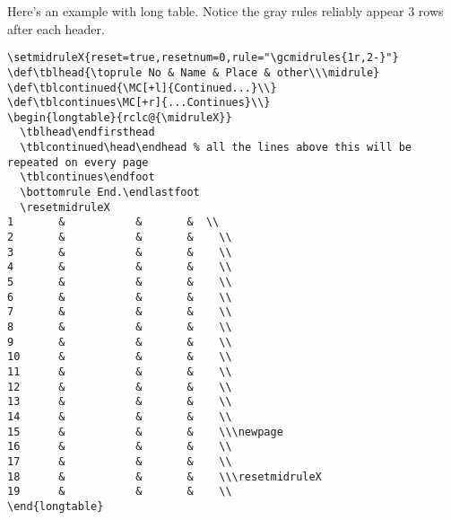 \documentclass[11pt,parskip=half]{scrartcl}
\begin{document}

%

\pagebreak

Here's an example with long table. Notice the gray rules reliably appear 3 rows after each header.
\begin{verbatim}
\setmidruleX{reset=true,resetnum=0,rule="\gcmidrules{1r,2-}"}
\def\tblhead{\toprule No & Name & Place & other\\\midrule}
\def\tblcontinued{\MC[+l]{Continued...}\\}
\def\tblcontinues\MC[+r]{...Continues}\\}
\begin{longtable}{rclc@{\midruleX}}
  \tblhead\endfirsthead
  \tblcontinued\head\endhead % all the lines above this will be repeated on every page
  \tblcontinues\endfoot
  \bottomrule End.\endlastfoot
  \resetmidruleX
1       &           &       &  \\
2       &           &       &    \\
3       &           &       &    \\
4       &           &       &    \\
5       &           &       &    \\
6       &           &       &    \\
7       &           &       &    \\
8       &           &       &    \\
9       &           &       &    \\
10      &           &       &    \\
11      &           &       &    \\
12      &           &       &    \\
13      &           &       &    \\
14      &           &       &    \\
15      &           &       &    \\\newpage
16      &           &       &    \\
17      &           &       &    \\
18      &           &       &    \\\resetmidruleX
19      &           &       &    \\
\end{longtable}
\end{verbatim}
\end{document}
